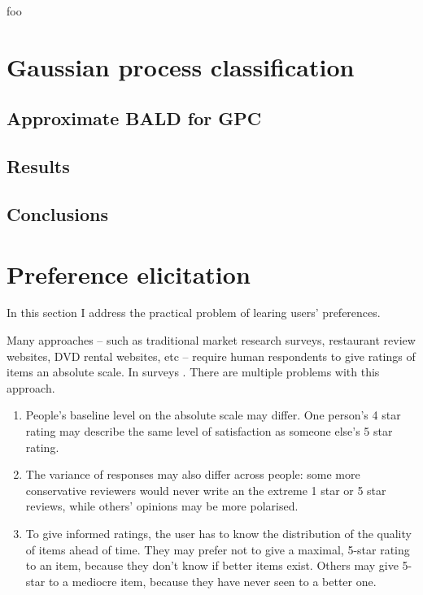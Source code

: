 foo

\section{Gaussian process classification}

\subsection{Approximate BALD for GPC}
\subsection{Results}
\subsection{Conclusions}

\section{Preference elicitation}

In this section I address the practical problem of learing users' preferences.

Many approaches -- such as traditional market research surveys, restaurant review websites, DVD rental websites, etc -- require human respondents to give ratings of items an absolute scale. In surveys .
There are multiple problems with this approach.
\begin{enumerate}
	\item People's baseline level on the absolute scale may differ. One person's 4 star rating may describe the same level of satisfaction as someone else's 5 star rating.
	\item The variance of responses may also differ across people: some more conservative reviewers would never write an the extreme 1 star or 5 star reviews, while others' opinions may be more polarised.
	\item To give informed ratings, the user has to know the distribution of the quality of items ahead of time. They may prefer not to give a maximal, 5-star rating to an item, because they don't know if better items exist. Others may give 5-star to a mediocre item, because they have never seen to a better one.
\end{enumerate} 

